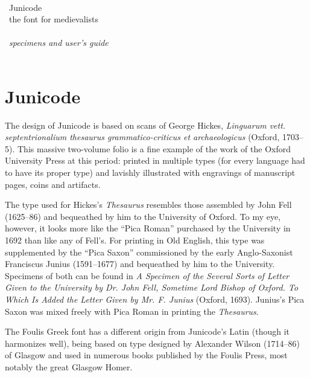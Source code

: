 \documentclass[12pt,a4paper,openany]{book}
\begin{document}
\begin{titlepage}
\huge\noindent
{\color{myRed}}\\[5cm]
\Huge \hfill {\color{myBlue}Junicode}\hfill \\[1cm]
\huge \hfill the font for medievalists\hfill \\[1cm]
 \Huge\hfill {\color{myRed}}\hfill \\[1cm]
 \huge\hfill {\itshape specimens and user’s guide}\hfill \\
\vfill
{\color{myRed}}
\end{titlepage}
\mainmatter
{}
\chapter*{\color{myBlue}Junicode}
\large

\noindent The design of Junicode is based on scans of George Hickes,
          {\itshape Linguarum vett. septentrionalium thesaurus
            grammatico-criticus et archaeologicus} (Oxford, 1703–5). This massive two-volume folio is a fine
          example of the work of the Oxford University Press at this
          period: printed in multiple types (for every language had to
          have its proper type) and lavishly
          illustrated with engravings of manuscript pages, coins and
          artifacts.

The type used for Hickes’s {\itshape Thesaurus} resembles those assembled
by John Fell (1625–86) and bequeathed by him to the University of
Oxford. To my eye, however, it looks more like the “Pica Roman”
purchased by the University in 1692 than like any of Fell’s. For printing in Old English, this type was
supplemented by the “Pica Saxon” commissioned by the early
Anglo-Saxonist Franciscus Junius (1591–1677) and bequeathed by him to
the University. Specimens of both can be found in {\itshape A Specimen of the
Several Sorts of Letter Given to the University by Dr. John Fell,
Sometime Lord Bishop of Oxford. To Which Is Added the Letter Given by
Mr. F. Junius} (Oxford, 1693). Junius’s Pica Saxon
was mixed freely with Pica Roman in printing the {\itshape Thesaurus}.

The Foulis Greek font has a different origin from Junicode’s Latin
(though it harmonizes well), being based on type designed by Alexander
Wilson (1714–86) of Glasgow and used in numerous books published by
the Foulis Press, most notably the great Glasgow Homer.
\end{document}
